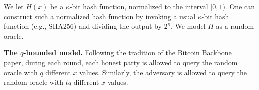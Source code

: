 We let $H(x)$ be a $\kappa$-bit hash function, normalized to the interval $[0, 1)$.
One can construct such a normalized hash function by invoking a usual $\kappa$-bit hash
function (e.g., SHA256) and dividing the output by $2^\kappa$. We model $H$ as a random oracle.

\noindent
\textbf{The $q$-bounded model.}
Following the tradition of the Bitcoin Backbone~\cite{backbone} paper,
during each round, each honest party is allowed to query the random oracle with $q$
different $x$ values. Similarly, the adversary is allowed to query the random oracle
with $t q$ different $x$ values.